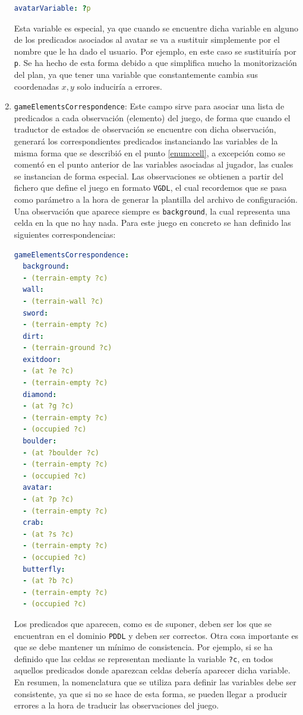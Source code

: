 \begin{enumerate}
    \begin{lstlisting}[language=yaml]
avatarVariable: ?p
    \end{lstlisting}
    
    Esta variable es especial, ya que cuando se encuentre dicha variable en alguno de los predicados asociados
    al avatar se va a sustituir simplemente por el nombre que le ha dado el usuario. Por ejemplo,
    en este caso se sustituiría por \texttt{p}. Se ha hecho de esta forma debido a que simplifica
    mucho la monitorización del plan, ya que tener una variable que constantemente cambia sus coordenadas
    $x,y$ solo induciría a errores.
    
    \item \texttt{gameElementsCorrespondence}: Este campo sirve para asociar una lista de predicados
    a cada observación (elemento) del juego, de forma que cuando el traductor de estados de observación
    se encuentre con dicha observación, generará los correspondientes predicados instanciando las variables
    de la misma forma que se describió en el punto \ref{enum:cell}, a excepción como se comentó en el
    punto anterior de las variables asociadas al jugador, las cuales se instancian de forma especial.
    Las observaciones se obtienen a partir del fichero que define el juego en formato \texttt{VGDL}, el
    cual recordemos que se pasa como parámetro a la hora de generar la plantilla del archivo de configuración.
    Una observación que aparece siempre es \texttt{background}, la cual representa una celda en la que no
    hay nada. Para este juego en concreto se han definido las siguientes correspondencias:
    
    \begin{lstlisting}[language=yaml]
gameElementsCorrespondence:
  background:
  - (terrain-empty ?c)
  wall:
  - (terrain-wall ?c)
  sword:
  - (terrain-empty ?c)
  dirt:
  - (terrain-ground ?c)
  exitdoor:
  - (at ?e ?c)
  - (terrain-empty ?c)
  diamond:
  - (at ?g ?c)
  - (terrain-empty ?c)
  - (occupied ?c)
  boulder:
  - (at ?boulder ?c)
  - (terrain-empty ?c)
  - (occupied ?c)
  avatar:
  - (at ?p ?c)
  - (terrain-empty ?c)
  crab:
  - (at ?s ?c)
  - (terrain-empty ?c)
  - (occupied ?c)
  butterfly:
  - (at ?b ?c)
  - (terrain-empty ?c)
  - (occupied ?c)    
    \end{lstlisting}
    
    Los predicados que aparecen, como es de suponer, deben ser los que se encuentran en el dominio
    \texttt{PDDL} y deben ser correctos. Otra cosa importante es que se debe mantener un mínimo de consistencia.
    Por ejemplo, si se ha definido que las celdas se representan mediante la variable \texttt{?c}, en
    todos aquellos predicados donde aparezcan celdas debería aparecer dicha variable. En resumen, la nomenclatura
    que se utiliza para definir las variables debe ser consistente, ya que si no se hace de esta forma,
    se pueden llegar a producir errores a la hora de traducir las observaciones del juego.
    

\end{enumerate}
